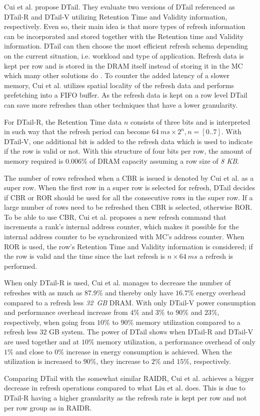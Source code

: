 Cui et al. \cite{dtail} propose DTail. They evaluate two versions of DTail referenced as DTail-R and DTail-V utilizing Retention Time and Validity information, respectively. Even so, their main idea is that more types of refresh information can be incorporated and stored together with the Retention time and Validity information. DTail can then choose the most efficient refresh schema depending on the current situation, i.e. workload and type of application. Refresh data is kept per row and is stored in the DRAM itself instead of storing it in the MC which many other solutions do \cite{raidr}\cite{smartrefresh}\cite{refrint}. To counter the added latency of a slower memory, Cui et al. utilizes spatial locality of the refresh data and performs prefetching into a FIFO buffer. As the refresh data is kept on a row level DTail can save more refreshes than other techniques that have a lower granularity.

For DTail-R, the Retention Time data $n$ consists of three bits and is interpreted in such way that the refresh period can become \(64\:ms \times 2^n, n = [0..7]\). With DTail-V, one additional bit is added to the refresh data which is used to indicate if the row is valid or not. With this structure of four bits per row, the amount of memory required is $0.006\%$ of DRAM capacity assuming a row size of \textit{8 KB}.

The number of rows refreshed when a CBR is issued is denoted by Cui et al. as a super row. When the first row in a super row is selected for refresh, DTail decides if CBR or ROR should be used for all the consecutive rows in the super row. If a large number of rows need to be refreshed then CBR is selected, otherwise ROR. To be able to use CBR, Cui et al. proposes a new refresh command that increments a rank's internal address counter, which makes it possible for the internal address counter to be synchronized with MC's address counter. When ROR is used, the row's Retention Time and Validity information is considered; if the row is valid and the time since the last refresh is $n \times 64\:ms$ a refresh is performed. 

When only DTail-R is used, Cui et al. manages to decrease the number of refreshes with as much as $87.9\%$ and thereby only have $16.7\%$ energy overhead compared to a refresh less \textit{32~GB} DRAM. With only DTail-V power consumption and performance overhead increase from $4\%$ and $3\%$ to $90\%$ and $23\%$, respectively, when going from $10\%$ to $90\%$ memory utilization compared to a refresh less 32 GB system. The power of DTail shows when DTail-R and DTail-V are used together and at $10\%$ memory utilization, a performance overhead of only $1\%$ and close to $0\%$ increase in energy consumption is achieved. When the utilization is increased to $90\%$, they increase to $2\%$ and $15\%$, respectively.

Comparing DTail with the somewhat similar RAIDR, Cui et al. achieves a bigger decrease in refresh operations compared to what Liu et al. does. This is due to DTail-R having a higher granularity as the refresh rate is kept per row and not per row group as in RAIDR.